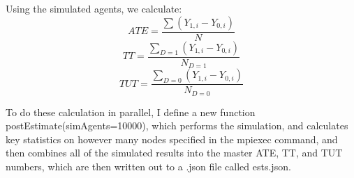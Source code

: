 \documentclass{article}
\begin{document}
Using the simulated agents, we calculate:
$$ATE=\frac{\sum(Y_{1,i} - Y_{0,i})}{N}$$
$$TT=\frac{\sum_{D=1}(Y_{1,i} - Y_{0,i})}{N_{D=1}}$$
$$TUT=\frac{\sum_{D=0}(Y_{1,i} - Y_{0,i})}{N_{D=0}}$$

To do these calculation in parallel, I define a new function postEstimate(simAgents=10000), which performs the simulation, and calculates key statistics on however many nodes specified in the mpiexec command, and then combines all of the simulated results into the master ATE, TT, and TUT numbers, which are then written out to a .json file called ests.json.
\end{document}
